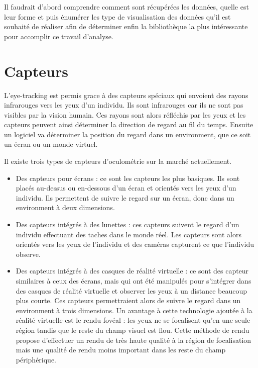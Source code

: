 \documentclass[12pt]{article}
\begin{document}
\bigskip
Il faudrait d'abord comprendre comment sont récupérées les données, quelle est
leur forme et puis énumérer les type de visualisation des données qu'il est
souhaité de réaliser afin de déterminer enfin la bibliothèque la plus
intéressante pour accomplir ce travail d'analyse.


\section{Capteurs}

L'eye-tracking est permis grace à des capteurs spéciaux qui envoient des rayons
infrarouges vers les yeux d'un individu. Ils sont infrarouges car ils ne sont
pas visibles par la vision humain. Ces rayons sont alors réfléchis par les yeux
et les capteurs peuvent ainsi déterminer la direction de regard au fil du temps.
Ensuite un logiciel va déterminer la position du regard dans un environment, que
ce soit un écran ou un monde virtuel.

\bigskip
Il existe trois types de capteurs d'oculométrie sur la marché actuellement.
\begin{itemize}
  \item Des capteurs pour écrans : ce sont les capteurs les plus basiques. Ils
        sont placés au-dessus ou en-dessous d'un écran et orientés vers les yeux
        d'un individu. Ils permettent de suivre le regard sur un écran, donc
        dans un environment à deux dimensions.
  \item Des capteurs intégrés à des lunettes : ces capteurs suivent le regard
        d'un individu effectuant des taches dans le monde réel. Les capteurs
        sont alors orientés vers les yeux de l'individu et des caméras capturent
        ce que l'individu observe.
  \item Des capteurs intégrés à des casques de réalité virtuelle : ce sont des
        capteur similaires à ceux des écrans, mais qui ont été manipulés pour
        s'intégrer dans des casques de réalité virtuelle et observer les yeux à
        un distance beaucoup plus courte. Ces capteurs permettraient alors de
        suivre le regard dans un environment à trois dimensions. Un avantage à
        cette technologie ajoutée à la réalité virtuelle est le rendu fovéal
        \cite{wiki:foveated_rendering} : les yeux ne se focalisent qu'en une
        seule région tandis que le reste du champ visuel est flou. Cette méthode
        de rendu propose d'effectuer un rendu de très haute qualité à la région
        de focalisation mais une qualité de rendu moins important dans les reste
        du champ périphérique.
\end{itemize}
\end{document}
